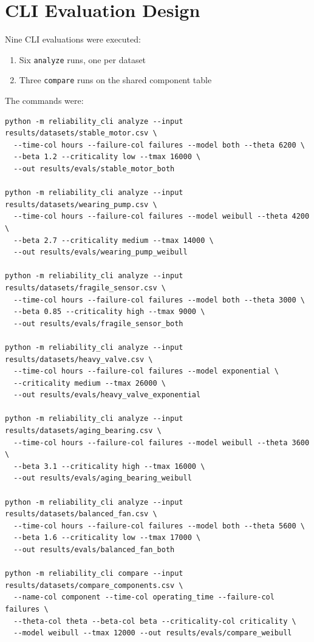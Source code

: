 \documentclass[11pt]{article}
\begin{document}
\section{CLI Evaluation Design}
Nine CLI evaluations were executed:

\begin{enumerate}
\item Six \texttt{analyze} runs, one per dataset
\item Three \texttt{compare} runs on the shared component table
\end{enumerate}

The commands were:

\begin{verbatim}
python -m reliability_cli analyze --input results/datasets/stable_motor.csv \
  --time-col hours --failure-col failures --model both --theta 6200 \
  --beta 1.2 --criticality low --tmax 16000 \
  --out results/evals/stable_motor_both

python -m reliability_cli analyze --input results/datasets/wearing_pump.csv \
  --time-col hours --failure-col failures --model weibull --theta 4200 \
  --beta 2.7 --criticality medium --tmax 14000 \
  --out results/evals/wearing_pump_weibull

python -m reliability_cli analyze --input results/datasets/fragile_sensor.csv \
  --time-col hours --failure-col failures --model both --theta 3000 \
  --beta 0.85 --criticality high --tmax 9000 \
  --out results/evals/fragile_sensor_both

python -m reliability_cli analyze --input results/datasets/heavy_valve.csv \
  --time-col hours --failure-col failures --model exponential \
  --criticality medium --tmax 26000 \
  --out results/evals/heavy_valve_exponential

python -m reliability_cli analyze --input results/datasets/aging_bearing.csv \
  --time-col hours --failure-col failures --model weibull --theta 3600 \
  --beta 3.1 --criticality high --tmax 16000 \
  --out results/evals/aging_bearing_weibull

python -m reliability_cli analyze --input results/datasets/balanced_fan.csv \
  --time-col hours --failure-col failures --model both --theta 5600 \
  --beta 1.6 --criticality low --tmax 17000 \
  --out results/evals/balanced_fan_both

python -m reliability_cli compare --input results/datasets/compare_components.csv \
  --name-col component --time-col operating_time --failure-col failures \
  --theta-col theta --beta-col beta --criticality-col criticality \
  --model weibull --tmax 12000 --out results/evals/compare_weibull


\end{verbatim}
\end{document}
